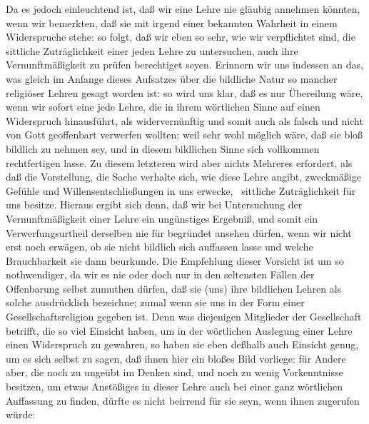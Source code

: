 Da es jedoch einleuchtend ist, daß wir eine Lehre nie gläubig annehmen könnten, wenn wir bemerkten, daß sie mit irgend einer bekannten Wahrheit in einem Widerspruche stehe: so folgt, daß wir eben so sehr, wie wir verpflichtet sind, die sittliche Zuträglichkeit einer jeden Lehre zu untersuchen, auch ihre Vernunftmäßigkeit zu prüfen berechtiget seyen. Erinnern wir uns indessen an das, was gleich im Anfange dieses Aufsatzes über die bildliche Natur so mancher religiöser Lehren gesagt worden ist: so wird uns klar, daß es nur Übereilung wäre, wenn wir sofort eine jede Lehre, die in ihrem wörtlichen Sinne auf einen Widerspruch hinausführt, als widervernünftig und somit auch als falsch und nicht von Gott geoffenbart verwerfen wollten; weil sehr wohl möglich wäre, daß sie bloß bildlich zu nehmen sey, und in diesem bildlichen Sinne sich vollkommen rechtfertigen lasse. Zu diesem letzteren wird aber nichts Mehreres erfordert, als daß die Vorstellung, die Sache verhalte sich, wie diese Lehre angibt, zweckmäßige Gefühle und Willensentschließungen in uns erwecke, \dh\  sittliche Zuträglichkeit für uns besitze. Hieraus ergibt sich denn, daß wir bei Untersuchung der Vernunftmäßigkeit einer Lehre ein ungünstiges Ergebniß, und somit ein Verwerfungsurtheil derselben nie für begründet ansehen dürfen, wenn wir nicht erst noch erwägen, ob sie nicht bildlich sich auffassen lasse und welche Brauchbarkeit sie dann beurkunde. Die Empfehlung dieser Vorsicht ist um so nothwendiger, da  wir es nie oder doch nur in den seltensten Fällen der Offenbarung selbst zumuthen dürfen, daß sie (uns) ihre bildlichen Lehren als solche ausdrücklich bezeichne; zumal wenn sie uns in der Form einer Gesellschaftsreligion gegeben ist. Denn was diejenigen Mitglieder der Gesellschaft betrifft, die so viel Einsicht haben, um in der wörtlichen Auslegung einer Lehre einen Widerspruch zu gewahren, so haben sie eben deßhalb auch Einsicht genug, um es sich selbst zu sagen, daß ihnen hier ein bloßes Bild vorliege: für Andere aber, die noch zu ungeübt im Denken sind, und noch zu wenig Vorkenntnisse besitzen, um etwas Anstößiges in dieser Lehre auch bei einer ganz wörtlichen Auffassung zu finden, dürfte es nicht beirrend für sie seyn, wenn ihnen zugerufen würde:  \par
